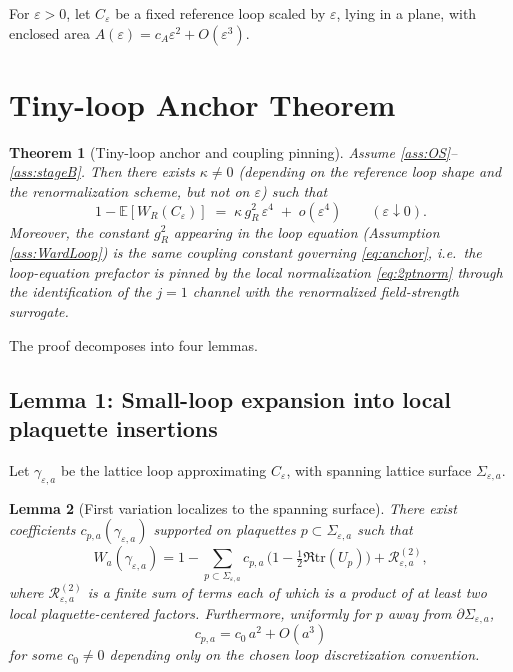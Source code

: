 \documentclass[11pt]{article}
\newtheorem{theorem}{Theorem}[section]
\newtheorem{lemma}[theorem]{Lemma}
\theoremstyle{definition}
\newcommand{\E}{\mathbb{E}}
\newcommand{\tr}{\mathrm{tr}}
\newcommand{\1}{\mathbf{1}}
\begin{document}
For $\varepsilon>0$, let $C_\varepsilon$ be a fixed reference loop scaled by $\varepsilon$, lying in a plane,
with enclosed area $A(\varepsilon)=c_A\varepsilon^2+O(\varepsilon^3)$.

\section{Tiny-loop Anchor Theorem}
\begin{theorem}[Tiny-loop anchor and coupling pinning]\label{thm:anchor}
Assume \ref{ass:OS}--\ref{ass:stageB}. Then there exists $\kappa\neq 0$ (depending on the reference loop shape and
the renormalization scheme, but not on $\varepsilon$) such that
\begin{equation}\label{eq:anchor}
1-\E[W_R(C_\varepsilon)] \;=\; \kappa\,g_R^2\,\varepsilon^4 \;+\; o(\varepsilon^4)\qquad(\varepsilon\downarrow 0).
\end{equation}
Moreover, the constant $g_R^2$ appearing in the loop equation (Assumption \ref{ass:WardLoop}) is the same coupling
constant governing \eqref{eq:anchor}, i.e.\ the loop-equation prefactor is pinned by the local normalization
\eqref{eq:2ptnorm} through the identification of the $j=1$ channel with the renormalized field-strength surrogate.
\end{theorem}

The proof decomposes into four lemmas.

\subsection{Lemma 1: Small-loop expansion into local plaquette insertions}
Let $\gamma_{\varepsilon,a}$ be the lattice loop approximating $C_\varepsilon$, with spanning lattice surface
$\Sigma_{\varepsilon,a}$.

\begin{lemma}[First variation localizes to the spanning surface]\label{lem:localize}
There exist coefficients $c_{p,a}(\gamma_{\varepsilon,a})$ supported on plaquettes $p\subset\Sigma_{\varepsilon,a}$ such that
\begin{equation}\label{eq:loopexp1}
W_a(\gamma_{\varepsilon,a})
=
1-\sum_{p\subset\Sigma_{\varepsilon,a}} c_{p,a}\, \Big(1-\tfrac12\Re\tr(U_p)\Big)
+\mathcal R^{(2)}_{\varepsilon,a},
\end{equation}
where $\mathcal R^{(2)}_{\varepsilon,a}$ is a finite sum of terms each of which is a product of at least two
local plaquette-centered factors. Furthermore, uniformly for $p$ away from $\partial\Sigma_{\varepsilon,a}$,
\[
c_{p,a}=c_0\,a^2+O(a^3)
\]
for some $c_0\neq 0$ depending only on the chosen loop discretization convention.
\end{lemma}
\end{document}
